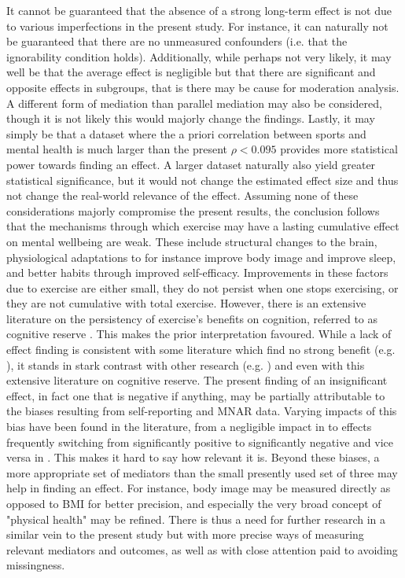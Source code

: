 It cannot be guaranteed that the absence of a strong long-term effect is not due to various imperfections
in the present study. For instance, it can naturally not be guaranteed that there are no unmeasured confounders
(i.e. that the ignorability condition holds). Additionally, while perhaps not very likely, it may well be that
the average effect is negligible but that there are significant and opposite effects in subgroups, that is there
may be cause for moderation analysis. A different form of mediation than parallel mediation may also be considered,
though it is not likely this would majorly change the findings.
Lastly, it may simply be that a dataset where the a priori correlation
between sports and mental health is much larger than the present $\rho < 0.095$ provides more statistical power
towards finding an effect.
A larger dataset naturally also yield greater statistical significance, but it would not change the estimated effect size
and thus not change the real-world relevance of the effect.
Assuming none of these considerations majorly compromise the present results, the conclusion follows that
the mechanisms through which exercise may have a lasting cumulative effect on mental wellbeing are weak.
These include structural changes to the brain, physiological adaptations to for instance
improve body image and improve sleep, and better habits through improved self-efficacy.
Improvements in these factors due to exercise are either small, they do not persist when one stops exercising,
or they are not cumulative with total exercise.
However, there is an extensive literature on the persistency of exercise's benefits on cognition, referred to as
cognitive reserve \cite{cheng2016cognitive,stern2009cognitive}. This makes the prior interpretation favoured.
While a lack of effect finding is consistent with some literature which find no strong benefit (e.g. ),
it stands in stark contrast with other research (e.g. ) and even with this extensive literature
on cognitive reserve.
The present finding of an insignificant effect, in fact one that is negative if anything, may be partially attributable
to the biases resulting from self-reporting and MNAR data.
Varying impacts of this bias have been found in the literature, from a negligible impact in 
to effects frequently switching from significantly positive to significantly negative and vice versa in .
This makes it hard to say how relevant it is.
Beyond these biases, a more appropriate set of mediators than the small presently used set of three may help
in finding an effect. For instance, body image may be measured directly as opposed to BMI for better precision,
and especially the very broad concept of "physical health" may be refined.
There is thus a need for further research in a similar vein to the present study but with more precise ways of measuring
relevant mediators and outcomes, as well as with close attention paid to avoiding missingness.

